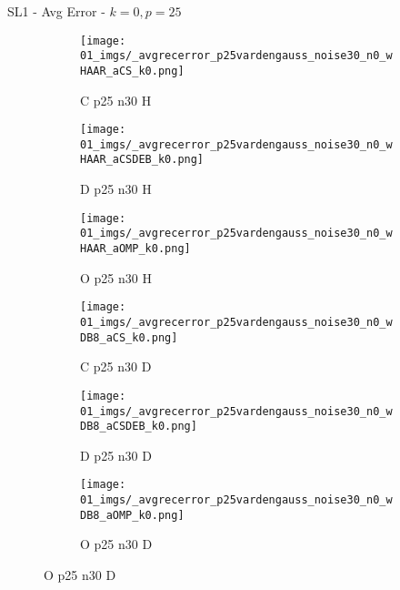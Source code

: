 \begin{frame}{SL1 - Avg Error - $k=0,p=25$}{}
\begin{figure}
\vspace{5pt}

\begin{subfigure}{0.13\textwidth}
\texttt{[image: 01\_imgs/\_avgrecerror\_p25vardengauss\_noise30\_n0\_wHAAR\_aCS\_k0.png]}
\caption*{\tiny C p25 n30 H}
\end{subfigure}
\begin{subfigure}{0.13\textwidth}
\texttt{[image: 01\_imgs/\_avgrecerror\_p25vardengauss\_noise30\_n0\_wHAAR\_aCSDEB\_k0.png]}
\caption*{\tiny D p25 n30 H}
\end{subfigure}
\begin{subfigure}{0.13\textwidth}
\texttt{[image: 01\_imgs/\_avgrecerror\_p25vardengauss\_noise30\_n0\_wHAAR\_aOMP\_k0.png]}
\caption*{\tiny O p25 n30 H}
\end{subfigure}
\begin{subfigure}{0.13\textwidth}
\texttt{[image: 01\_imgs/\_avgrecerror\_p25vardengauss\_noise30\_n0\_wDB8\_aCS\_k0.png]}
\caption*{\tiny C p25 n30 D}
\end{subfigure}
\begin{subfigure}{0.13\textwidth}
\texttt{[image: 01\_imgs/\_avgrecerror\_p25vardengauss\_noise30\_n0\_wDB8\_aCSDEB\_k0.png]}
\caption*{\tiny D p25 n30 D}
\end{subfigure}
\begin{subfigure}{0.13\textwidth}
\texttt{[image: 01\_imgs/\_avgrecerror\_p25vardengauss\_noise30\_n0\_wDB8\_aOMP\_k0.png]}
\caption*{\tiny O p25 n30 D}
\end{subfigure}
\end{figure}
\end{frame}

